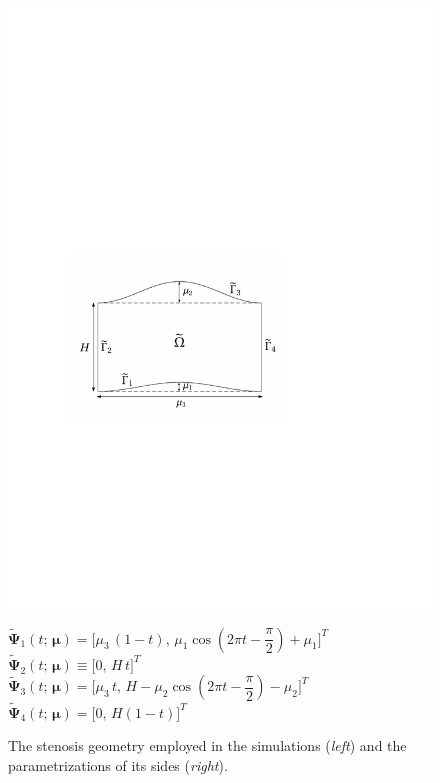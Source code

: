 \documentclass[12pt, a4paper, twoside, openright]{report}
\numberwithin{equation}{chapter}
\theoremstyle{theorem}
\theoremstyle{definition}
\theoremstyle{remark}
\theoremstyle{proposition}
\numberwithin{figure}{chapter}
\newcommand{\wt}[1]{\widetilde{#1}}
\newcommand{\bg}[1]{\boldsymbol{#1}}
\begin{document}
\begin{figure}[b!]
			\begin{minipage}{0.4\textwidth}
				\center
				\includegraphics[scale = 0.7]{domain_stenosis}
			\end{minipage}
			\hfill
			\begin{minipage}{0.5\textwidth}
				$\wt{\bg{\Psi}}_1(t; \, \bg{\mu}) = \big[ \mu_3 \, (1-t), \, \mu_1 \cos\left( 2 \pi t - \dfrac{\pi}{2} \right) + \mu_1 \big]^T$ \\[0.3cm]
				$\wt{\bg{\Psi}}_2(t; \, \bg{\mu}) \equiv \big[ 0, \, H \, t \big]^T$ \\[0.3cm]
				$\wt{\bg{\Psi}}_3(t; \, \bg{\mu}) = \big[ \mu_3 \, t, \, H - \mu_2 \cos\left( 2 \pi t - \dfrac{\pi}{2} \right) - \mu_2 \big]^T$ \\[0.3cm]
				$\wt{\bg{\Psi}}_4(t; \, \bg{\mu}) = \big[ 0, \, H (1 - t) \big]^T$
			\end{minipage}
			
			\vspace*{-0.3cm}
			
			\caption{The stenosis geometry employed in the simulations (\emph{left}) and the parametrizations of its sides (\emph{right}).}
			\label{fig:stenosis-domain}
		\end{figure}
		
\end{document}
